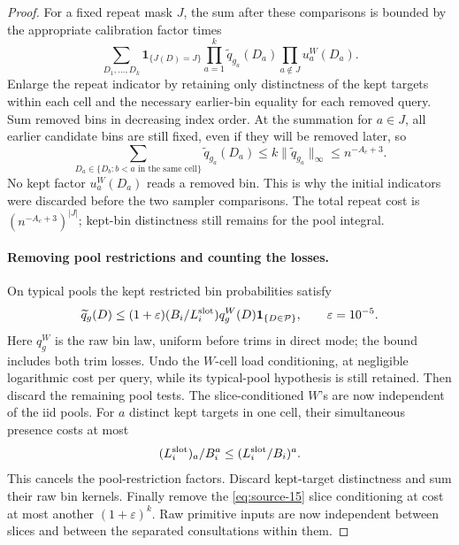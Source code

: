 \begin{proof}
For a fixed repeat mask \(J\), the sum after these comparisons is
bounded by the appropriate calibration factor times
\[
 \sum_{D_1,\ldots,D_k}\mathbf1_{\{J(D)=J\}}
          \prod_{a=1}^k\widetilde q_{g_a}(D_a)
          \prod_{a\notin J}u_a^W(D_a).
\]
Enlarge the repeat indicator by retaining only distinctness of the
kept targets within each cell and the necessary earlier-bin equality
for each removed query. Sum removed bins in decreasing index order.
At the summation for \(a\in J\), all earlier candidate bins are
still fixed, even if they will be removed later, so
\[
 \sum_{D_a\in\{D_b:b<a\text{ in the same cell}\}}
                   \widetilde q_{g_a}(D_a)
 \le k\|\widetilde q_{g_a}\|_\infty\le n^{-A_c+3}.
\]
No kept factor \(u_a^W(D_a)\) reads a removed bin. This is why the
initial indicators were discarded before the two sampler comparisons.
The total repeat cost is \((n^{-A_c+3})^{|J|}\); kept-bin
distinctness still remains for the pool integral.

\paragraph{Removing pool restrictions and counting the losses.}
On typical pools the kept restricted bin probabilities satisfy
\[
 \widetilde q_g(D)\le
 (1+\varepsilon)(B_i/L_i^{\rm slot})q_g^W(D)
                     \mathbf1_{\{D\in\mathcal P\}},
 \qquad \varepsilon=10^{-5}.
\]
Here \(q_g^W\) is the raw bin law, uniform before trims in direct
mode; the bound includes both trim losses. Undo the \(W\)-cell
load conditioning, at negligible logarithmic cost per query, while
its typical-pool hypothesis is still retained. Then discard the
remaining pool tests. The slice-conditioned \(W\)'s are now
independent of the iid pools. For \(a\) distinct kept targets in
one cell, their simultaneous presence costs at most
\[
 (L_i^{\rm slot})_a/B_i^a\le(L_i^{\rm slot}/B_i)^a.
\]
This cancels the pool-restriction factors. Discard kept-target
distinctness and sum their raw bin kernels. Finally remove the
\eqref{eq:source-15} slice conditioning at cost at most another
\((1+\varepsilon)^k\). Raw primitive inputs are now independent
between slices and between the separated consultations within them.


\end{proof}
